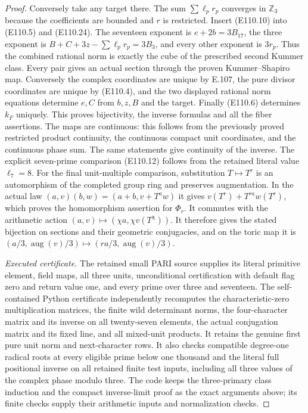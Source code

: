 \begin{proof}
Conversely take any target there. The sum
$\sum\ell_pr_p$ converges in $\mathbb Z_3$ because the coefficients
are bounded and $r$ is restricted.
Insert (E110.10) into (E110.5) and (E110.24).
The seventeen exponent is $e+2b=3B_{17}$, the three exponent is
$B+C+3z-\sum\ell_pr_p=3B_3$, and every other exponent is
$3r_p$. Thus the combined rational norm is exactly the cube of
the prescribed second Kummer class.
Every pair gives an actual section through the proven
Kummer--Shapiro map. Conversely the complex coordinates are
unique by E.107, the pure divisor coordinates are unique by
(E110.4), and the two displayed rational norm equations determine
$e,C$ from $b,z,B$ and the target. Finally (E110.6) determines
$k_F$ uniquely. This proves bijectivity, the inverse formulas
and all the fiber assertions.
The maps are continuous: this follows from the previously proved
restricted product continuity, the continuous compact unit
coordinates, and the continuous phase sum.
The same statements give continuity of the inverse.
The explicit seven-prime comparison (E110.12) follows from the
retained literal value $\ell_7=8$.
For the final unit-multiple comparison, substitution $T\mapsto T^r$
is an automorphism of the completed group ring and preserves
augmentation. In the actual law
$(a,v)(b,w)=(a+b,v+T^aw)$ it gives
$v(T^r)+T^{ra}w(T^r)$, which proves the homomorphism assertion
for $\Phi_r$. It commutes with the arithmetic action
$(a,v)\mapsto(\chi a,\chi v(T^\chi))$.
It therefore gives the stated bijection on sections and their
geometric conjugacies, and on the toric map it is
$(a/3,\operatorname{aug}(v)/3)\mapsto
(ra/3,\operatorname{aug}(v)/3)$.

\emph{Executed certificate.}
The retained small PARI source supplies its literal primitive
element, field maps, all three units, unconditional certification
with default flag zero and return value one, and every prime
over three and seventeen. The self-contained Python certificate
independently recomputes the characteristic-zero multiplication
matrices, the finite wild determinant norms, the four-character
matrix and its inverse on all twenty-seven elements, the actual
conjugation matrix and its fixed line, and all mixed-unit products.
It retains the genuine first pure unit norm and next-character
rows. It also checks compatible degree-one radical roots at
every eligible prime below one thousand and the literal
full positional inverse on all retained finite test inputs,
including all three values of the complex phase modulo three.
The code keeps the three-primary class induction and the compact
inverse-limit proof as the exact arguments above; its finite
checks supply their arithmetic inputs and normalization checks.
\end{proof}
